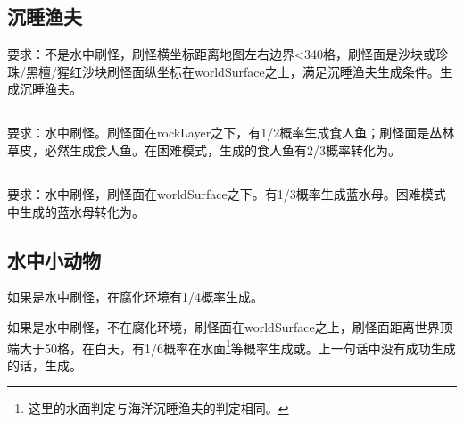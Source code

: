 \subsection{沉睡渔夫}
要求：不是水中刷怪，刷怪横坐标距离地图左右边界<340格，刷怪面是沙块或珍珠/黑檀/猩红沙块刷怪面纵坐标在worldSurface之上，满足沉睡渔夫生成条件。生成沉睡渔夫。

\subsection{}
要求：水中刷怪。刷怪面在rockLayer之下，有1/2概率生成食人鱼；刷怪面是丛林草皮，必然生成食人鱼。在困难模式，生成的食人鱼有2/3概率转化为。

\subsection{}
要求：水中刷怪，刷怪面在worldSurface之下。有1/3概率生成蓝水母。困难模式中生成的蓝水母转化为。
\begin{figure}[h]
    \centering
    \caption{}
\end{figure}

\subsection{水中小动物}
如果是水中刷怪，在腐化环境有1/4概率生成。

如果是水中刷怪，不在腐化环境，刷怪面在worldSurface之上，刷怪面距离世界顶端大于50格，在白天，有1/6概率在水面\footnote{这里的水面判定与海洋沉睡渔夫的判定相同。}等概率生成或。上一句话中没有成功生成的话，生成。

